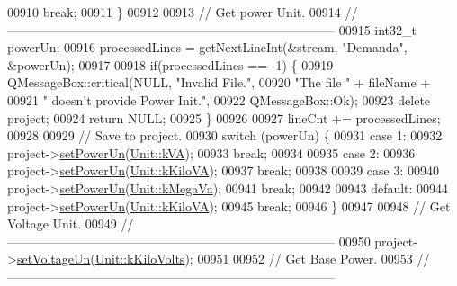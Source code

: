 \begin{DoxyCode}
00910     \textcolor{keywordflow}{break};
00911   \}
00912 
00913 \textcolor{comment}{// Get power Unit.}
00914 \textcolor{comment}{//------------------------------------------------------------------------------}
00915   int32\_t powerUn;
00916   processedLines = getNextLineInt(&stream, \textcolor{stringliteral}{"Demanda"}, &powerUn);
00917 
00918   \textcolor{keywordflow}{if}(processedLines == -1) \{
00919     QMessageBox::critical(NULL, \textcolor{stringliteral}{"Invalid File."},
00920                           \textcolor{stringliteral}{"The file "} + fileName +
00921                           \textcolor{stringliteral}{" doesn't provide Power Init."},
00922                           QMessageBox::Ok);
00923     \textcolor{keyword}{delete} project;
00924     \textcolor{keywordflow}{return} NULL;
00925   \}
00926 
00927   lineCnt += processedLines;
00928 
00929 \textcolor{comment}{// Save to project.}
00930   \textcolor{keywordflow}{switch} (powerUn) \{
00931   \textcolor{keywordflow}{case} 1:
00932     project->\hyperlink{class_project_aa46b8645d2047c1a2e8d329b9ebbc120}{setPowerUn}(\hyperlink{class_unit_ace265ae255370ccacfd5370337572c3ba72b181a842ae2759488a2fa1410d3696}{Unit::kVA});
00933     \textcolor{keywordflow}{break};
00934 
00935   \textcolor{keywordflow}{case} 2:
00936     project->\hyperlink{class_project_aa46b8645d2047c1a2e8d329b9ebbc120}{setPowerUn}(\hyperlink{class_unit_ace265ae255370ccacfd5370337572c3bac9e5154522fbb810d7aed75c3ff47cb2}{Unit::kKiloVA});
00937     \textcolor{keywordflow}{break};
00938 
00939   \textcolor{keywordflow}{case} 3:
00940     project->\hyperlink{class_project_aa46b8645d2047c1a2e8d329b9ebbc120}{setPowerUn}(\hyperlink{class_unit_ace265ae255370ccacfd5370337572c3ba6039da0ed20f8bee64305bab8bdec365}{Unit::kMegaVa});
00941     \textcolor{keywordflow}{break};
00942 
00943   \textcolor{keywordflow}{default}:
00944     project->\hyperlink{class_project_aa46b8645d2047c1a2e8d329b9ebbc120}{setPowerUn}(\hyperlink{class_unit_ace265ae255370ccacfd5370337572c3bac9e5154522fbb810d7aed75c3ff47cb2}{Unit::kKiloVA});
00945     \textcolor{keywordflow}{break};
00946   \}
00947 
00948 \textcolor{comment}{// Get Voltage Unit.}
00949 \textcolor{comment}{//------------------------------------------------------------------------------}
00950   project->\hyperlink{class_project_aa26b488b2e93c8a8c6b4423ce07df4a1}{setVoltageUn}(\hyperlink{class_unit_a55b07dfa9457e1eca2c7194fe0cfc3c1a35a201a658c2cd89766787c657e9a54d}{Unit::kKiloVolts});
00951 
00952 \textcolor{comment}{// Get Base Power.}
00953 \textcolor{comment}{//------------------------------------------------------------------------------}

\end{DoxyCode}
